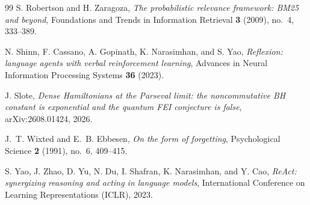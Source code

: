 \begin{thebibliography}{99}
S. Robertson and H. Zaragoza, \emph{The probabilistic relevance framework: BM25 and beyond}, Foundations and Trends in Information Retrieval \textbf{3} (2009), no.~4, 333--389.

N. Shinn, F. Cassano, A. Gopinath, K. Narasimhan, and S. Yao, \emph{Reflexion: language agents with verbal reinforcement learning}, Advances in Neural Information Processing Systems \textbf{36} (2023).

J. Slote, \emph{Dense Hamiltonians at the Parseval limit: the noncommutative BH constant is exponential and the quantum FEI conjecture is false}, arXiv:2608.01424, 2026.

J.~T. Wixted and E.~B. Ebbesen, \emph{On the form of forgetting}, Psychological Science \textbf{2} (1991), no.~6, 409--415.

S. Yao, J. Zhao, D. Yu, N. Du, I. Shafran, K. Narasimhan, and Y. Cao, \emph{ReAct: synergizing reasoning and acting in language models}, International Conference on Learning Representations (ICLR), 2023.

\end{thebibliography}
